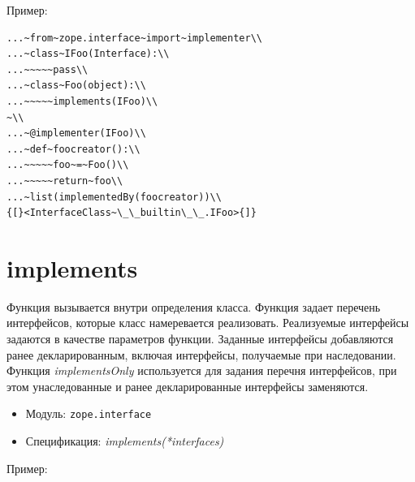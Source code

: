 \documentclass[a4paper,openany,twoside,draft]{book}
\providecommand*{\DUroletitlereference}[1]{\textsl{#1}}
\begin{document}
Пример:

\begin{verbatim}
...~from~zope.interface~import~implementer\\
...~class~IFoo(Interface):\\
...~~~~~pass\\
...~class~Foo(object):\\
...~~~~~implements(IFoo)\\
~\\
...~@implementer(IFoo)\\
...~def~foocreator():\\
...~~~~~foo~=~Foo()\\
...~~~~~return~foo\\
...~list(implementedBy(foocreator))\\
{[}<InterfaceClass~\_\_builtin\_\_.IFoo>{]}
\end{verbatim}


\section*{implements%
  \label{implements}%
}

Функция вызывается внутри определения класса.  Функция задает перечень
интерфейсов, которые класс намеревается реализовать.  Реализуемые
интерфейсы задаются в качестве параметров функции.  Заданные
интерфейсы добавляются ранее декларированным, включая интерфейсы, получаемые
при наследовании.  Функция \DUroletitlereference{implementsOnly} используется для задания
перечня интерфейсов, при этом унаследованные и ранее декларированные
интерфейсы заменяются.

\begin{itemize}

\item Модуль: \texttt{zope.interface}

\item Спецификация: \DUroletitlereference{implements(*interfaces)}

\end{itemize}

Пример:
\end{document}
